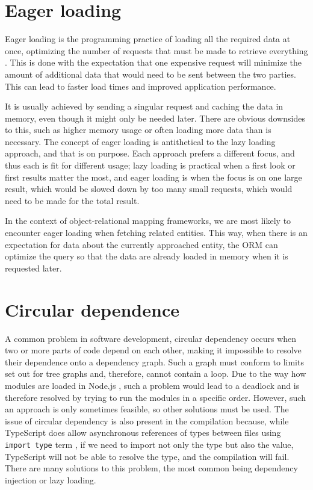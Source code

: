 \section*{Eager loading}
Eager loading is the programming practice of loading all the required data at
once, optimizing the number of requests that must be made to retrieve everything
\cite{sequelize-eager-loading}. This is done with the expectation that one
expensive request will minimize the amount of additional data that would need to
be sent between the two parties. This can lead to faster load times and improved
application performance.

It is usually achieved by sending a singular request and caching the data in
memory, even though it might only be needed later. There are obvious downsides
to this, such as higher memory usage or often loading more data than is
necessary. The concept of eager loading is antithetical to the lazy loading
approach, and that is on purpose. Each approach prefers a different focus, and
thus each is fit for different usage; lazy loading is practical when a first
look or first results matter the most, and eager loading is when the focus is on
one large result, which would be slowed down by too many small requests, which
would need to be made for the total result.

In the context of object-relational mapping frameworks, we are most likely to
encounter eager loading when fetching related entities. This way, when there is
an expectation for data about the currently approached entity, the ORM can
optimize the query so that the data are already loaded in memory when it is
requested later.


\section*{Circular dependence}
A common problem in software development, circular dependency occurs when two or
more parts of code depend on each other, making it impossible to resolve their
dependence onto a dependency graph. Such a graph must conform to limits set out
for tree graphs and, therefore, cannot contain a loop. Due to the way how
modules are loaded in Node.js \cite{commonjsModulesNode}, such a problem would
lead to a deadlock and is therefore resolved by trying to run the modules in a
specific order. However, such an approach is only sometimes feasible, so other
solutions must be used. The issue of circular dependency is also present in the
compilation because, while TypeScript does allow asynchronous references of
types between files using \texttt{import type} term \cite{typescript-modules},
if we need to import not only the type but also the value, TypeScript will not
be able to resolve the type, and the compilation will fail. There are many
solutions to this problem, the most common being dependency injection or lazy
loading.

